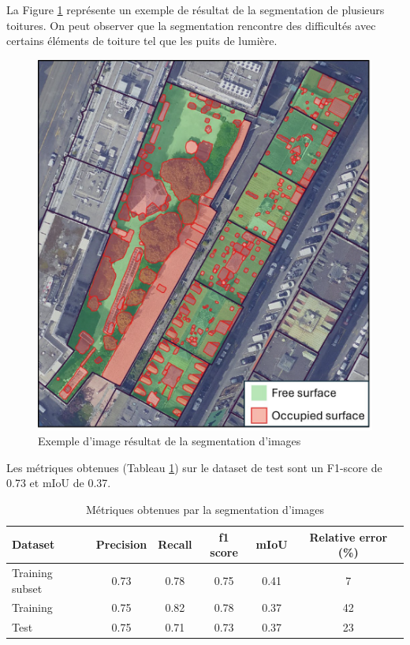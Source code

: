 \par{La Figure \ref{fig:stdl_09_segmentation_image_resultats} représente un exemple de résultat de la segmentation de plusieurs toitures. On peut observer que la segmentation rencontre des difficultés avec certains éléments de toiture tel que les puits de lumière.}
\begin{figure}[H]
    \centering
    \includegraphics[width=1\linewidth]{02-main//figures/ch2/stdl_09_segmentation_image_resultats.png}
    \caption{Exemple d’image résultat de la segmentation d’images \cite{herny_detection_2024}}
    \label{fig:stdl_09_segmentation_image_resultats}
\end{figure}
\newpage
\par{Les métriques obtenues (Tableau \ref{tab:stdl_06_segmentation_image_resultats}) sur le dataset de test sont un F1-score de 0.73 et mIoU de 0.37.}
\begin{table}[H]
    \centering
    \begin{tabular}{|l|c|c|c|c|c|}
    \hline
    Dataset & Precision & Recall & f1 score & mIoU & Relative error (\%) \\
    \hline
    Training subset & 0.73 & 0.78 & 0.75 & 0.41 & 7 \\
    Training & 0.75 & 0.82 & 0.78 & 0.37 & 42 \\
    Test & 0.75 & 0.71 & 0.73 & 0.37 & 23 \\
    \hline
    \end{tabular}
    \caption{Métriques obtenues par la segmentation d'images}
    \label{tab:stdl_06_segmentation_image_resultats}
\end{table}
